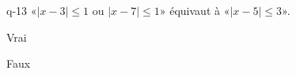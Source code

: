\begin{truefalse}{q-13}
«$|x-3|\leq 1$ ou $|x-7|\leq 1$» équivaut à «$|x-5|\leq 3$».
\item Vrai
\item* Faux
\end{truefalse}

